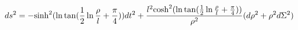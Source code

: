 \begin{equation}
ds^2=-\hbox{sinh}^2(\ln \tan (\frac{1}{2}\ln \frac{\rho}{l}+\frac{\pi}{4}))dt^2+\frac{l^2\hbox{cosh}^2(\ln \tan (\frac{1}{2}\ln \frac{\rho}{l}+\frac{\pi}{4}))}
{\rho^2}(d\rho^2+\rho^2d\Sigma^2)
\end{equation}

